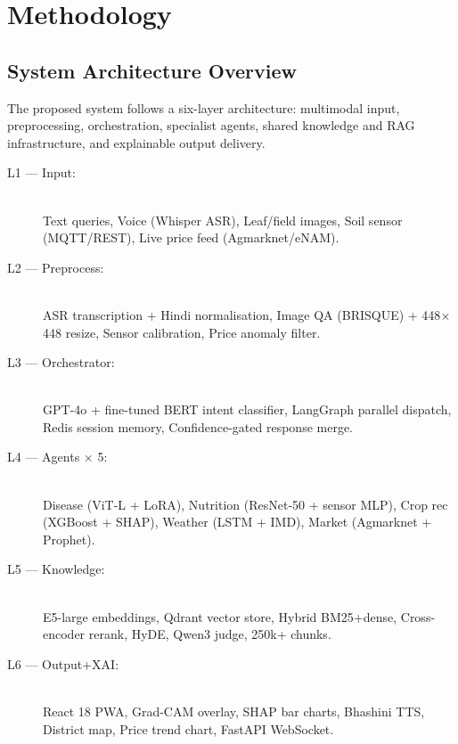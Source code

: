 \documentclass[12pt,a4paper]{article}
\begin{document}
\newpage
\section{Methodology}

\subsection{System Architecture Overview}
The proposed system follows a six-layer architecture: multimodal input, preprocessing, orchestration, specialist agents, shared knowledge and RAG infrastructure, and explainable output delivery.
\begin{description}
    \item[L1 --- Input:] \hfill \\ Text queries, Voice (Whisper ASR), Leaf/field images, Soil sensor (MQTT/REST), Live price feed (Agmarknet/eNAM).
    \item[L2 --- Preprocess:] \hfill \\ ASR transcription + Hindi normalisation, Image QA (BRISQUE) + 448$\times$448 resize, Sensor calibration, Price anomaly filter.
    \item[L3 --- Orchestrator:] \hfill \\ GPT-4o + fine-tuned BERT intent classifier, LangGraph parallel dispatch, Redis session memory, Confidence-gated response merge.
    \item[L4 --- Agents $\times$ 5:] \hfill \\ Disease (ViT-L + LoRA), Nutrition (ResNet-50 + sensor MLP), Crop rec (XGBoost + SHAP), Weather (LSTM + IMD), Market (Agmarknet + Prophet).
    \item[L5 --- Knowledge:] \hfill \\ E5-large embeddings, Qdrant vector store, Hybrid BM25+dense, Cross-encoder rerank, HyDE, Qwen3 judge, 250k+ chunks.
    \item[L6 --- Output+XAI:] \hfill \\ React 18 PWA, Grad-CAM overlay, SHAP bar charts, Bhashini TTS, District map, Price trend chart, FastAPI WebSocket.
\end{description}
\end{document}
